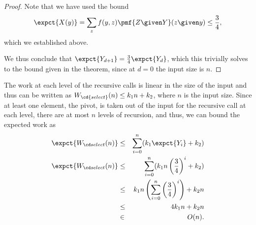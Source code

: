 {\begin{proof}
Note that we have used the bound 
\[
\expct{X(y)} = \sum_{z}{f(y,z) \pmf{Z \given Y}(z \given y)} \le \frac34,
\]
which we established above.


We thus conclude that $\expct{Y_{d+1}} = \frac34 \expct{Y_d}$, which
this trivially solves to the bound given in the theorem, since at
$d=0$ the input size is $n$.
\end{proof}



The work at each level of the recursive calls is linear in the size of
the input and thus can be written as $W_{\cd{select}}(n) \leq k_1n + k_2$, where $n$ is the input size.
%
Since at least one element, the pivot, is taken out of the input for
the recursive call at each level, there are at most $n$ levels of
recursion, and thus, we can bound the expected work as
\begin{eqnarray*}
\expct{W_{\ksmall}(n)}
& \leq & \sum_{i=0}^n (k_1 \expct{Y_i} + k_2) \\
\expct{W_{\ksmall}(n)}
& \leq & \sum_{i=0}^n (k_1 n \left(\frac{3}{4}\right)^i + k_2) \\
& \leq & k_1 n \left(\sum_{i=0}^n \left(\frac{3}{4}\right)^i\right) + k_2 n \\
& \leq & 4 k_1 n + k_2 n\\
& \in & O(n).
\end{eqnarray*}

}
